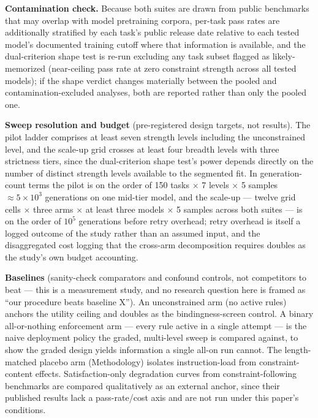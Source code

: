 \documentclass[11pt]{article}
\begin{document}
\textbf{Contamination check.} Because both suites are drawn from public benchmarks that may overlap with model pretraining corpora, per-task pass rates are additionally stratified by each task's public release date relative to each tested model's documented training cutoff where that information is available, and the dual-criterion shape test is re-run excluding any task subset flagged as likely-memorized (near-ceiling pass rate at zero constraint strength across all tested models); if the shape verdict changes materially between the pooled and contamination-excluded analyses, both are reported rather than only the pooled one.

\textbf{Sweep resolution and budget} (pre-registered design targets, not results). The pilot ladder comprises at least seven strength levels including the unconstrained level, and the scale-up grid crosses at least four breadth levels with three strictness tiers, since the dual-criterion shape test's power depends directly on the number of distinct strength levels available to the segmented fit. In generation-count terms the pilot is on the order of 150 tasks $\times$ 7 levels $\times$ 5 samples $\approx 5\times10^{3}$ generations on one mid-tier model, and the scale-up --- twelve grid cells $\times$ three arms $\times$ at least three models $\times$ 5 samples across both suites --- is on the order of $10^{5}$ generations before retry overhead; retry overhead is itself a logged outcome of the study rather than an assumed input, and the disaggregated cost logging that the cross-arm decomposition requires doubles as the study's own budget accounting.

\textbf{Baselines} (sanity-check comparators and confound controls, not competitors to beat --- this is a measurement study, and no research question here is framed as ``our procedure beats baseline X''). An unconstrained arm (no active rules) anchors the utility ceiling and doubles as the bindingness-screen control. A binary all-or-nothing enforcement arm --- every rule active in a single attempt --- is the naive deployment policy the graded, multi-level sweep is compared against, to show the graded design yields information a single all-on run cannot. The length-matched placebo arm (Methodology) isolates instruction-load from constraint-content effects. Satisfaction-only degradation curves from constraint-following benchmarks are compared qualitatively as an external anchor, since their published results lack a pass-rate/cost axis and are not run under this paper's conditions.
\end{document}
